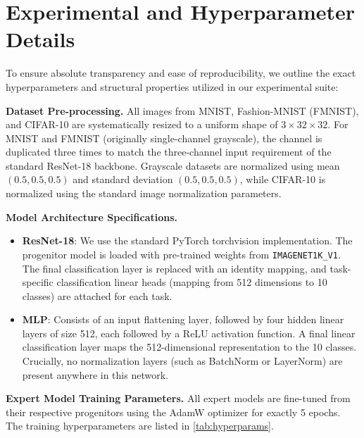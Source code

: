 \documentclass{article}
\begin{document}



\newpage
\appendix
\onecolumn
{}

\section{Experimental and Hyperparameter Details}
\label{app:hyperparameters}

To ensure absolute transparency and ease of reproducibility, we outline the exact hyperparameters and structural properties utilized in our experimental suite:

\textbf{Dataset Pre-processing.} All images from MNIST, Fashion-MNIST (FMNIST), and CIFAR-10 are systematically resized to a uniform shape of $3 \times 32 \times 32$. For MNIST and FMNIST (originally single-channel grayscale), the channel is duplicated three times to match the three-channel input requirement of the standard ResNet-18 backbone. Grayscale datasets are normalized using mean $(0.5, 0.5, 0.5)$ and standard deviation $(0.5, 0.5, 0.5)$, while CIFAR-10 is normalized using the standard image normalization parameters.

\textbf{Model Architecture Specifications.}
\begin{itemize}
    \item \textbf{ResNet-18}: We use the standard PyTorch torchvision implementation. The progenitor model is loaded with pre-trained weights from \texttt{IMAGENET1K\_V1}. The final classification layer is replaced with an identity mapping, and task-specific classification linear heads (mapping from 512 dimensions to 10 classes) are attached for each task.
    \item \textbf{MLP}: Consists of an input flattening layer, followed by four hidden linear layers of size 512, each followed by a ReLU activation function. A final linear classification layer maps the 512-dimensional representation to the 10 classes. Crucially, no normalization layers (such as BatchNorm or LayerNorm) are present anywhere in this network.
\end{itemize}

\textbf{Expert Model Training Parameters.} All expert models are fine-tuned from their respective progenitors using the AdamW optimizer \cite{loshchilov2018decoupled} for exactly 5 epochs. The training hyperparameters are listed in \cref{tab:hyperparams}.
\end{document}
